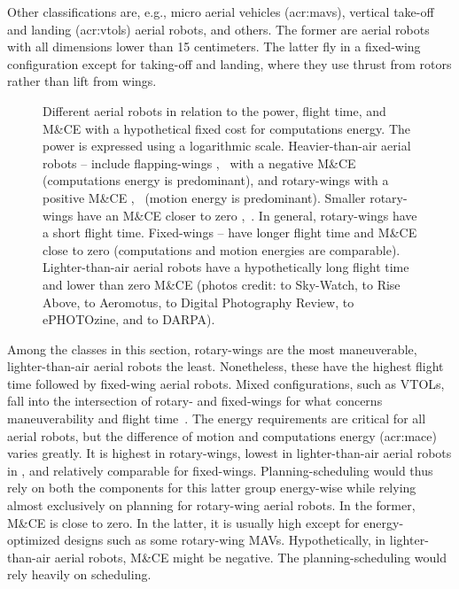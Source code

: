 Other classifications are, e.g., micro aerial vehicles (\Gls{acr:mav}s), vertical take-off and landing (\Gls{acr:vtol}s) aerial robots, and others. The former are aerial robots with all dimensions lower than 15 centimeters. The latter fly in a fixed-wing configuration except for taking-off and landing, where they use thrust from rotors rather than lift from wings.

\begin{figure}[p!]
  \centering
  \footnotesize{}\selectfont
  
  \vspace*{36pt}
  \caption[Different aerial robots in relation to the power, flight time, and M\&CE]{Different aerial robots in relation to the power, flight time, and M\&CE with a hypothetical fixed cost for computations energy. The power is expressed using a logarithmic scale. Heavier-than-air aerial robots -- include flapping-wings ,~ with a negative M\&CE (computations energy is predominant), and rotary-wings with a positive M\&CE ,~ (motion energy is predominant). Smaller rotary-wings have an M\&CE closer to zero ,~. In general, rotary-wings have a short flight time. Fixed-wings -- have longer flight time and M\&CE close to zero (computations and motion energies are comparable). Lighter-than-air aerial robots  have a hypothetically long flight time and lower than zero M\&CE {\scriptsize(photos credit:  to Sky-Watch,  to Rise Above,  to Aeromotus,  to Digital Photography Review,  to ePHOTOzine, and  to DARPA)}.}
  \label{fig:robots-vs-power}
\end{figure}

Among the classes in this section, rotary-wings are the most maneuverable, lighter-than-air aerial robots the least. Nonetheless, these have the highest flight time followed by fixed-wing aerial robots. Mixed configurations, such as VTOLs, fall into the intersection of rotary- and fixed-wings for what concerns maneuverability and flight time~\citep{siciliano2016springer}. The energy requirements are critical for all aerial robots, but the difference of motion and computations energy (\Gls{acr:mace}) varies greatly. It is highest in rotary-wings, lowest in lighter-than-air aerial robots in , and relatively comparable for fixed-wings. Planning-scheduling would thus rely on both the components for this latter group energy-wise while relying almost exclusively on planning for rotary-wing aerial robots. In the former, M\&CE is close to zero. In the latter, it is usually high except for energy-optimized designs such as some rotary-wing MAVs. Hypothetically, in lighter-than-air aerial robots, M\&CE might be negative. The planning-scheduling would rely heavily on scheduling.

